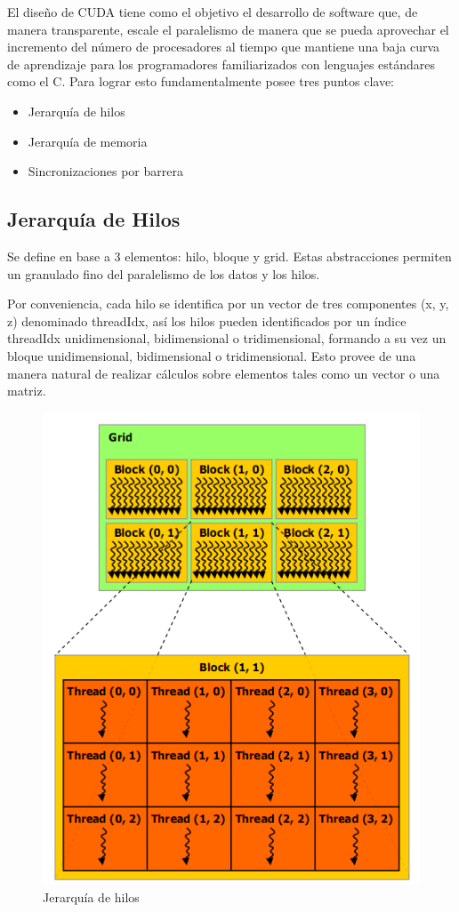 \documentclass[twoside]{article}
\begin{document}
El diseño de CUDA tiene como el objetivo el desarrollo de software que, de manera transparente, escale el paralelismo de manera que se pueda aprovechar el incremento del número de procesadores al tiempo que mantiene una baja curva de aprendizaje para los programadores familiarizados con lenguajes estándares como el C. Para lograr esto fundamentalmente posee tres puntos clave:

\begin{itemize}
   \item Jerarquía de hilos
   \item Jerarquía de memoria
   \item Sincronizaciones por barrera
\end{itemize}

\subsection{Jerarquía de Hilos}

Se define en base a 3 elementos: hilo, bloque y grid. Estas abstracciones permiten un granulado fino del paralelismo de los datos y los hilos.

Por conveniencia, cada hilo se identifica por un vector de tres componentes (x, y, z) denominado threadIdx, así los hilos pueden identificados por un índice threadIdx unidimensional, bidimensional o tridimensional, formando a su vez un bloque unidimensional, bidimensional o tridimensional. Esto provee de una manera natural de realizar cálculos sobre elementos tales como un vector o una matriz.

\begin{figure}
   \begin{center}
      \includegraphics[width=.5\textwidth]{ThreadHierarchy.png}
      \caption{\label{fig:ThreadHierarchy} Jerarquía de hilos}
   \end{center}
\end{figure}
\end{document}
